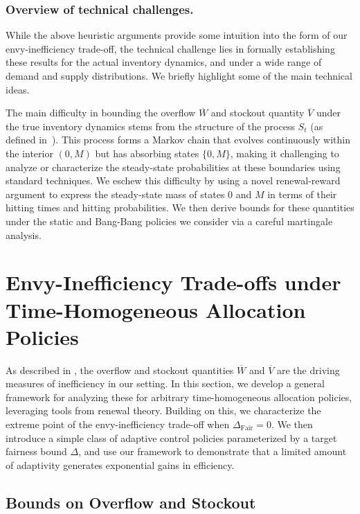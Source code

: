 \documentclass[mnsc,nonblindrev]{informs3}
\newcommand{\Dfair}{\Delta_{\text{Fair}}\xspace}
\renewcommand{\paragraph}[1]{\subsubsection*{#1}}
\begin{document}
\paragraph{Overview of technical challenges.} While the above heuristic arguments provide some intuition into the form of our envy-inefficiency trade-off, the technical challenge lies in formally establishing these results for the actual inventory dynamics, and under a wide range of demand and supply distributions. We briefly highlight some of the main technical ideas.

The main difficulty in bounding the overflow $\overline{W}$ and stockout quantity $\overline{V}$ under the true inventory dynamics stems from the structure of the process $S_t$ (as defined in~).
This process forms a Markov chain that evolves continuously within the interior $(0, M)$ but has absorbing states $\{0, M\}$, making it challenging to analyze or characterize the steady-state probabilities at these boundaries using standard techniques.
We eschew this difficulty by using a novel renewal-reward argument to express the steady-state mass of states $0$ and $M$ in terms of their hitting times and hitting probabilities. We then derive bounds for these quantities under the static and Bang-Bang policies we consider via a careful martingale analysis.



 
\section{Envy-Inefficiency Trade-offs under Time-Homogeneous Allocation Policies}
\label{sec:achievability}


As described in , the overflow and stockout quantities $\overline{W}$ and $\overline{V}$ are the driving measures of inefficiency in our setting. In this section, we develop a general framework for analyzing these for arbitrary time-homogeneous allocation policies, leveraging tools from renewal theory. Building on this, we characterize the extreme point of the envy-inefficiency trade-off when $\Dfair = 0$. We then introduce a simple class of adaptive control policies  parameterized by a target fairness bound $\Delta$, and use our framework to demonstrate that a limited amount of adaptivity generates exponential gains in efficiency. 

\subsection{Bounds on Overflow and Stockout}
\label{ssec:timehomogen}
\end{document}
